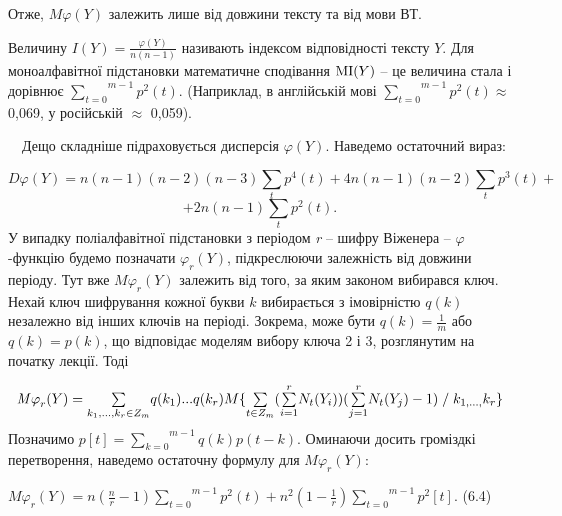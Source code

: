 \documentclass[a4paper]{article}
\newcounter{}
\newcommand\normalsubformula[1]{\text{\mathversion{normal}$#1$}}
\begin{document}
Отже,  ${\mathit{M\varphi }(Y)}$ залежить лише від довжини тексту та від мови
ВТ.

 Величину  ${I(Y)=\frac{\varphi (Y)}{n(n-1)}}$ називають індексом відповідності
тексту  ${Y}$. Для моноалфавітної підстановки математичне сподівання  
${\normalsubformula{\text{MI}}(Y)}$ \textit{ }– це величина стала і дорівнює 
${\overset{{m-1}}{\underset{{t=0}}{\sum }}{p^{{2}}(t)}}$. (Наприклад, в
англійській мові  ${\overset{{m-1}}{\underset{{t=0}}{\sum
}}{p^{{2}}(t)}}$${\approx}$ 0,069, у російській ${\approx}$ 0,059).

\ \ Дещо складніше підраховується дисперсія  ${\varphi (Y)}$. Наведемо
остаточний вираз:

\begin{equation*}
{\mathit{D\varphi }(Y)=n(n-1)(n-2)(n-3)\underset{{t}}{\sum
}{p^{{4}}(t)+4n(n-1)(n-2)\underset{{t}}{\sum }{p^{{3}}(t)+}}}
\end{equation*}
\begin{equation*}
{+2n(n-1)\underset{{t}}{\sum }{p^{{2}}(t)}\text{.}}
\end{equation*}
У випадку поліалфавітної підстановки з періодом \textit{r}\textit{ }– шифру
Віженера –  ${\varphi }${}-функцію будемо позначати  ${\varphi _{{r}}(Y)}$,
підкреслюючи залежність від довжини періоду. Тут вже  ${\mathit{M\varphi
}_{{r}}(Y)}$ залежить від того, за яким законом вибирався ключ. Нехай ключ
шифрування кожної букви  ${k}$ вибирається з імовірністю  ${q(k)}$ незалежно
від інших ключів на періоді. Зокрема, може бути  ${q(k)=\frac{1}{m}}$ або 
${q(k)=p(k)}$, що відповідає моделям вибору ключа 2 і 3, розглянутим на початку
лекції. Тоді 

\begin{equation*}
\begin{matrix}{\mathit{M\varphi
}_{{r}}(Y)=\underset{k_{{1}},\text{.}\text{.}\text{.},k_{{r}}\in Z_{{m}}}{\sum
}{q(k_{{1}})\text{.}\text{.}\text{.}q(k_{{r}})M\{\underset{{t\in Z_{{m}}}}{\sum
}{(\overset{{r}}{\underset{{i=1}}{\sum
}}{N_{{t}}(Y_{{i}}))(\overset{{r}}{\underset{{j=1}}{\sum
}}{N_{{t}}(Y_{{j}})-1)\;/\;k_{{1,\text{.}\text{.}\text{.},}}k_{{r}}}}}\}}}\hfill\null
\end{matrix}\hfill 
\end{equation*}
Позначимо  ${p[t]=\overset{{m-1}}{\underset{{k=0}}{\sum }}{q(k)p(t-k)}}$.
Оминаючи досить громіздкі перетворення, наведемо остаточну формулу для 
${\mathit{M\varphi }_{{r}}(Y)}$:


\bigskip

{\raggedleft
  ${\mathit{M\varphi
}_{{r}}(Y)=n(\frac{n}{r}-1)\overset{{m-1}}{\underset{{t=0}}{\sum
}}{p^{{2}}(t)+n^{{2}}(1-\frac{1}{r})}\overset{{m-1}}{\underset{{t=0}}{\sum
}}{p^{{2}}[t]}}$.  (6.4)
\par}
\end{document}
